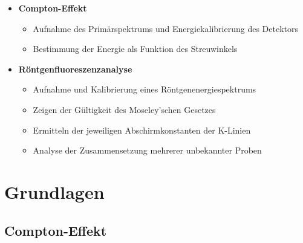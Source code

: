 \documentclass[ngerman]{scrartcl}
\begin{document}
\begin{itemize}
    \item \textbf{Compton-Effekt}
          \begin{itemize}
              \item Aufnahme des Primärspektrums und Energiekalibrierung des Detektors
              \item Bestimmung der Energie als Funktion des Streuwinkels
          \end{itemize}
    \item \textbf{Röntgenfluoreszenzanalyse}
          \begin{itemize}
              \item Aufnahme und Kalibrierung eines Röntgenenergiespektrums
              \item Zeigen der Gültigkeit des Moseley'schen Gesetzes
              \item Ermitteln der jeweiligen Abschirmkonstanten der K-Linien
              \item Analyse der Zusammensetzung mehrerer unbekannter Proben
          \end{itemize}
\end{itemize}


\section{Grundlagen}
\label{sec:grundlagen}

\subsection[Compton-Effekt]{Compton-Effekt \cite{ref:angabe_compton}}
\label{subsec:grundlagen_compton}
\end{document}
